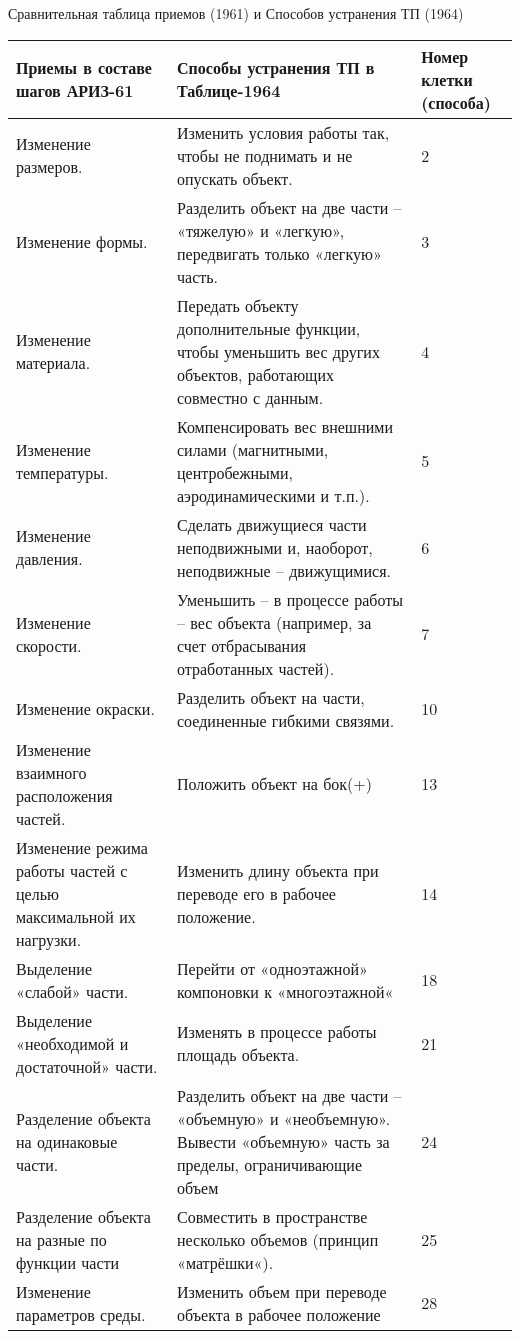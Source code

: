 \documentclass[11pt,a4paper]{article}
\begin{document}
Сравнительная таблица приемов (1961) и Способов устранения ТП (1964)
\begin{center}
  \begin{tabular}{|p{}|p{}|p{}|}\hline 
    Приемы в составе шагов АРИЗ-61& Способы устранения ТП в Таблице-1964&
Номер клетки (способа)\\\hline
Изменение размеров. & Изменить условия работы так, чтобы не поднимать и не
опускать объект.& 2\\\hline
Изменение формы.& Разделить объект на две части -- «тяжелую» и «легкую»,
передвигать только «легкую» часть.& 3\\\hline
Изменение материала. & Передать объекту дополнительные функции, чтобы
уменьшить вес других объектов, работающих совместно с данным. & 4\\\hline
Изменение температуры. & Компенсировать вес внешними силами (магнитными,
центробежными, аэродинамическими и т.п.). & 5\\\hline
Изменение давления. & Сделать движущиеся части неподвижными и, наоборот,
неподвижные -- движущимися. & 6\\\hline
Изменение скорости.  & Уменьшить -- в процессе работы -- вес объекта
(например, за счет отбрасывания отработанных частей). & 7\\\hline
Изменение окраски.  & Разделить объект на части, соединенные гибкими
связями. & 10 \\\hline
Изменение взаимного расположения частей.  & Положить объект на бок(+) &
13\\\hline
Изменение режима работы частей с целью максимальной их нагрузки.  & Изменить
длину объекта при переводе его в рабочее положение. & 14\\\hline
Выделение «слабой» части.  & Перейти от «одноэтажной» компоновки к
«многоэтажной« & 18\\\hline
Выделение «необходимой и достаточной» части. & Изменять в процессе работы
площадь объекта. & 21\\\hline
Разделение объекта на одинаковые части. & Разделить объект на две части --
«объемную» и «необъемную». Вывести «объемную» часть за пределы, ограничивающие
объем & 24\\\hline
Разделение объекта на разные по функции части & Совместить в пространстве
несколько объемов (принцип «матрёшки«). & 25\\\hline
Изменение параметров среды. & Изменить объем при переводе объекта в рабочее
положение & 28\\\hline

\end{tabular}
\end{center}
\end{document}
